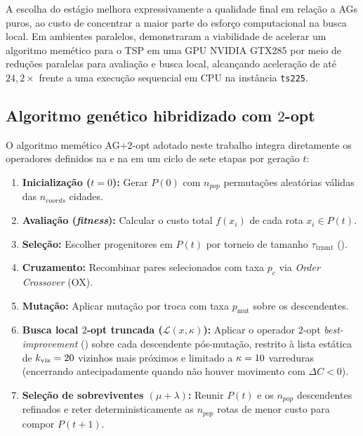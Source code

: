 A escolha do estágio melhora expressivamente a qualidade final em relação a AGs puros, ao custo de concentrar a maior parte do esforço computacional na busca local.
Em ambientes paralelos, \textcite{fujimoto2011highly} demonstraram a viabilidade de acelerar um algoritmo memético para o TSP em uma GPU NVIDIA GTX285 por meio de reduções paralelas para avaliação e busca local, alcançando aceleração de até \(24{,}2\times\) frente a uma execução sequencial em CPU na instância \texttt{ts225}.

\subsection{Algoritmo genético hibridizado com \texorpdfstring{\(2\)-opt}{2-opt}}\label{sec-251-ga-2opt}

O algoritmo memético AG+\(2\)-opt adotado neste trabalho integra diretamente os operadores definidos na  e na  em um ciclo de sete etapas por geração \(t\):

\begin{enumerate}
      \item
            \textbf{Inicialização (\(t=0\)):} Gerar \(P(0)\) com \(n_{pop}\) permutações aleatórias válidas das \(n_{coords}\) cidades.
      \item
            \textbf{Avaliação (\emph{fitness}):} Calcular o custo total \(f(x_i)\) de cada rota \(x_i \in P(t)\).
      \item
            \textbf{Seleção:} Escolher progenitores em \(P(t)\) por torneio de tamanho \(\tau_{\text{trnmt}}\) ().
      \item
            \textbf{Cruzamento:} Recombinar pares selecionados com taxa \(p_c\) via \emph{Order Crossover} (OX).
      \item
            \textbf{Mutação:} Aplicar mutação por troca com taxa \(p_{\text{mut}}\) sobre os descendentes.
      \item
            \textbf{Busca local \(2\)-opt truncada (\(\mathcal{L}(x, \kappa)\)):} Aplicar o operador \(2\)-opt \emph{best-improvement} () sobre cada descendente pós-mutação, restrito à lista estática de \(k_{\text{viz}} = 20\) vizinhos mais próximos e limitado a \(\kappa = 10\) varreduras (encerrando antecipadamente quando não houver movimento com \(\Delta C < 0\)).
      \item
            \textbf{Seleção de sobreviventes \((\mu + \lambda)\):} Reunir \(P(t)\) e os \(n_{pop}\) descendentes refinados e reter deterministicamente as \(n_{pop}\) rotas de menor custo para compor \(P(t+1)\).
\end{enumerate}

